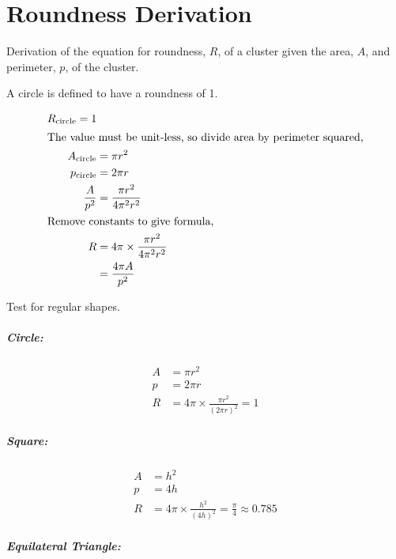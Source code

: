 
\chapter{Roundness Derivation}
\label{app:roundness_derivation}

Derivation of the equation for roundness, $R$, of a cluster given the area,
$A$, and perimeter, $p$, of the cluster.

A circle is defined to have a roundness of 1.

\begin{align}
	R_\textrm{circle} = 1 \\
\intertext{The value must be unit-less, so divide area by perimeter squared,}
	A_{\textrm{circle}} &= \pi r^2 \\
	p_{\textrm{circle}} &= 2\pi r \\
	\frac{A}{p^2} &= \frac{\pi r^2}{4\pi^2 r^2} \\
\intertext{Remove constants to give formula,}
	R &= 4\pi \times \frac{\pi r^2}{4\pi^2 r^2} \\
		&= \frac{4\pi A}{p^2}
\end{align}

Test for regular shapes.

\paragraph{Circle:}
\label{par:circle}

\begin{align}
	A &= \pi r^2 \\
	p &= 2\pi r \\
	R &= 4\pi \times \frac{\pi r^2}{{(2\pi r)}^2} = 1
\end{align}

\paragraph{Square:}
\label{par:square}

\begin{align}
	A &= h^2 \\
	p &= 4h \\
	R &= 4\pi \times \frac{h^2}{{(4h)}^2} = \frac{\pi}{4} \approx 0.785
\end{align}

\paragraph{Equilateral Triangle:}
\label{par:equalateral_triangle}

